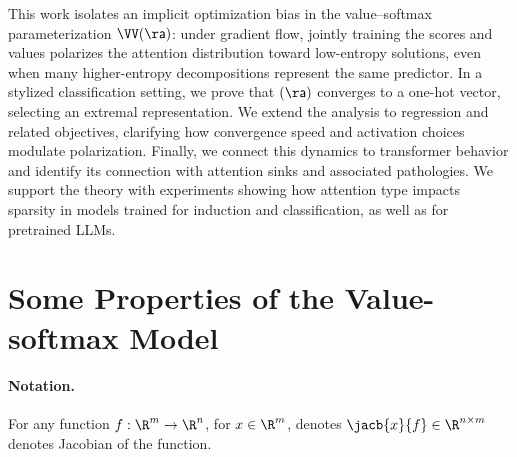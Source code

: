 \documentclass{article}
\theoremstyle{plain}
\theoremstyle{definition}
\theoremstyle{remark}
\begin{document}
This work isolates an implicit optimization bias in the value–softmax parameterization $\VV\sf(\aa)$: under gradient flow, jointly training the scores and values  polarizes the attention distribution toward low-entropy solutions, even when many higher-entropy decompositions represent the same predictor. In a stylized classification setting, we prove that $\sf(\aa)$ converges to a one-hot vector, selecting an extremal representation. We extend the analysis to regression and related objectives, clarifying how convergence speed and activation choices modulate polarization. 
Finally, we connect this dynamics to transformer behavior and identify its connection with attention sinks and associated pathologies. %
We support the theory with experiments showing how attention type impacts sparsity in models trained for induction and classification, as well as for pretrained LLMs.




\newpage
\appendix
\onecolumn




\section{Some Properties of the Value-softmax Model}

\paragraph{Notation.} For any function $f : \R^{m} \to  \R^{n}$, for $x \in \R^{m}$, denotes $\jacb{x}{f} \in \R^{n \times m}$ denotes Jacobian of the function. 
\end{document}
